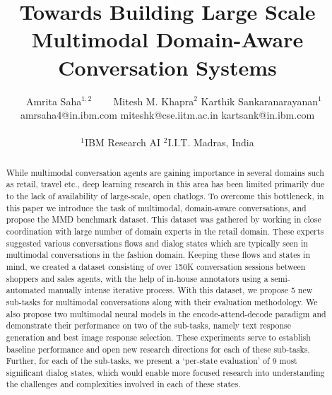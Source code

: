 \documentclass[letterpaper]{article} %
\begin{document}
%
\title{Towards Building Large Scale Multimodal Domain-Aware Conversation Systems}

\author{ \qquad~~ Amrita Saha$^{1,2}$ ~\qquad\qquad~~ Mitesh M. Khapra$^2$ \qquad\qquad Karthik Sankaranarayanan$^1$\\
amrsaha4@in.ibm.com \qquad\qquad\qquad miteshk@cse.iitm.ac.in \qquad\qquad\qquad\qquad kartsank@in.ibm.com \\\\
    $^1$\Large{IBM Research AI} \qquad
    $^2$\Large{I.I.T. Madras, India}\\%
}


\maketitle
\begin{abstract}
While multimodal conversation agents are gaining importance in several domains such as retail, travel etc., deep learning research in this area has been limited primarily due to the lack of availability of large-scale, open chatlogs. To overcome this bottleneck, in this paper we introduce the task of multimodal, domain-aware conversations, and propose the MMD benchmark dataset. This dataset was gathered by working in close coordination with large number of domain experts in the retail domain. These experts suggested various conversations flows and dialog states which are typically seen in multimodal conversations in the fashion domain. Keeping these flows and states in mind, we created a dataset consisting of over 150K conversation sessions between shoppers and sales agents, with the help of in-house annotators using a semi-automated manually intense iterative process. 
With this dataset, we propose 5 new sub-tasks for multimodal conversations along with their evaluation methodology. We also propose two multimodal neural models in the encode-attend-decode paradigm and demonstrate their performance on two of the sub-tasks, namely text response generation and best image response selection. These experiments serve to establish baseline performance and open new research directions for each of these sub-tasks. Further, for each of the sub-tasks, we present a `per-state evaluation' of 9 most significant dialog states, which would enable more focused research into understanding the challenges and complexities involved in each of these states.\end{abstract}
\end{document}
